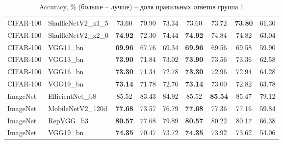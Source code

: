 \begin{table}[h!]
{\begin{tabular}{llccccccc}
CIFAR-100 & ShuffleNetV2\_x1\_5 &                  73.60 &                  70.90 &                  73.34 &                  73.60 &                  73.72 & \textbf{73.80} &                  61.30 \\
CIFAR-100 & ShuffleNetV2\_x2\_0 & \textbf{74.92} &                  72.30 &                  74.44 & \textbf{74.92} &                  74.84 &                  74.82 &                  63.04 \\
CIFAR-100 &          VGG11\_bn & \textbf{69.96} &                  67.76 &                  69.34 & \textbf{69.96} &                  69.56 &                  69.58 &                  59.90 \\
CIFAR-100 &          VGG13\_bn & \textbf{73.90} &                  71.84 &                  73.02 & \textbf{73.90} &                  73.56 &                  73.36 &                  62.58 \\
CIFAR-100 &          VGG16\_bn & \textbf{73.30} &                  71.34 &                  72.78 & \textbf{73.30} &                  72.96 &                  72.94 &                  64.28 \\
CIFAR-100 &          VGG19\_bn & \textbf{73.14} &                  71.78 &                  72.76 & \textbf{73.14} &                  73.00 &                  72.82 &                  63.78 \\
 ImageNet &   EfficientNet\_b8 &                  85.52 &                  83.43 &                  84.92 &                  85.52 & \textbf{85.54} &                  85.47 &                  79.12 \\
 ImageNet &  MobileNetV2\_120d & \textbf{77.68} &                  73.57 &                  76.79 & \textbf{77.68} &                  77.36 &                  77.16 &                  59.84 \\
 ImageNet &         RepVGG\_b3 & \textbf{80.57} &                  77.68 &                  79.89 & \textbf{80.57} &                  80.22 &                  80.17 &                  66.38 \\
 ImageNet &          VGG19\_bn & \textbf{74.35} &                  70.47 &                  73.72 & \textbf{74.35} &                  73.92 &                  73.62 &                  54.06 \\
\bottomrule
\end{tabular}%
}
\caption{Accuracy, \% (больше -- лучше) -- доля правильных ответов группа 1}
\label{tab:metrics:ACC_1}
\end{table}
